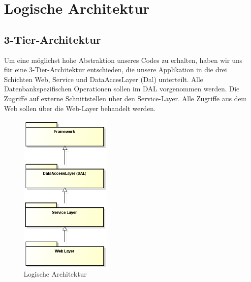 \chapter{Logische Architektur}
\section{3-Tier-Architektur}
	Um eine möglichst hohe Abstraktion unseres Codes zu erhalten, haben wir uns für eine 3-Tier-Architektur entschieden, die unsere Applikation in die drei Schichten Web, Service und DataAccesLayer (Dal) unterteilt. Alle Datenbankspezifischen Operationen sollen im DAL vorgenommen werden. Die Zugriffe auf externe Schnittstellen über den Service-Layer. Alle Zugriffe aus dem Web sollen über die Web-Layer behandelt werden. 
    \begin{figure}[H]
    	\centering
		\includegraphics[width=0.4\textwidth]{content/architekturdokumentation/images/LogischeArchitektur_plain.png}
  		\vspace{-10pt}
    	\caption{Logische Architektur}
	\end{figure}

\newpage
